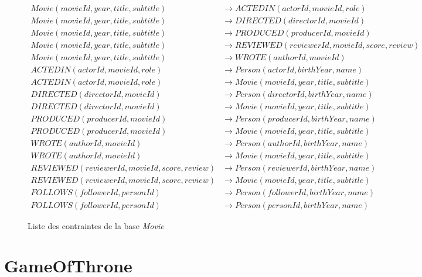 \begin{figure}[H]
    \centering
    \small
    \begin{align*}
        Movie(movieId, year, title, subtitle) &\to ACTEDIN(actorId, movieId, role) \\
        Movie(movieId, year, title, subtitle) &\to DIRECTED(directorId, movieId) \\
        Movie(movieId, year, title, subtitle) &\to PRODUCED(producerId, movieId) \\
        Movie(movieId, year, title, subtitle) &\to REVIEWED(reviewerId, movieId, score, review) \\
        Movie(movieId, year, title, subtitle) &\to WROTE(authorId, movieId) \\
        ACTEDIN(actorId, movieId, role) &\to Person(actorId, birthYear, name) \\
        ACTEDIN(actorId, movieId, role) &\to Movie(movieId, year, title, subtitle) \\
        DIRECTED(directorId, movieId) &\to Person(directorId, birthYear, name) \\
        DIRECTED(directorId, movieId) &\to Movie(movieId, year, title, subtitle) \\
        PRODUCED(producerId, movieId) &\to Person(producerId, birthYear, name) \\
        PRODUCED(producerId, movieId) &\to Movie(movieId, year, title, subtitle) \\
        WROTE(authorId, movieId) &\to Person(authorId, birthYear, name) \\
        WROTE(authorId, movieId) &\to Movie(movieId, year, title, subtitle) \\
        REVIEWED(reviewerId, movieId, score, review) &\to Person(reviewerId, birthYear, name) \\
        REVIEWED(reviewerId, movieId, score, review) &\to Movie(movieId, year, title, subtitle) \\
        FOLLOWS(followerId, personId) &\to Person(followerId, birthYear, name) \\
        FOLLOWS(followerId, personId) &\to Person(personId, birthYear, name)
    \end{align*}
    \caption{Liste des contraintes de la base \textit{Movie}}
\end{figure}

\section{GameOfThrone}

